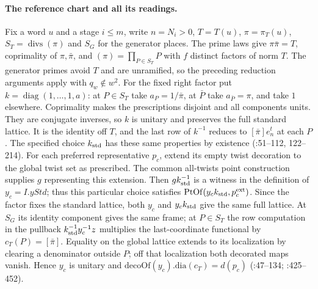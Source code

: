 \paragraph{The reference chart and all its readings.}
Fix a word $u$ and a stage $i\le m$, write $n=N_i>0$, $T=T(u)$, $\pi=\pi_T(u)$,
$S_T=\operatorname{divs}(\pi)$ and $S_G$ for the generator places.
The prime laws give
$\pi\bar\pi=T$, coprimality of $\pi,\bar\pi$, and
$(\pi)=\prod_{P\in S_T}P$ with $f$ distinct factors of norm $T$.
The generator primes avoid $T$ and are unramified, so the preceding
reduction arguments apply with $q_w\notin w^2$. For the fixed right
factor put $k=\operatorname{diag}(1,\ldots,1,a)$: at $P\in S_T$
take $a_P=1/\bar\pi$, at $\bar P$ take $a_{\bar P}=\pi$, and take
$1$ elsewhere. Coprimality makes the prescriptions disjoint and all
components units. They are conjugate inverses, so $k$ is unitary and
preserves the full standard lattice. It is the identity off $T$, and
the last row of $k^{-1}$ reduces to $[\bar\pi]e_n^t$ at each $P$.
The specified choice $k_{\rm std}$ has these same properties by
existence (:51--112,
122--214). For each preferred representative $p_c$, extend its empty
twist decoration to the global twist set as prescribed. The common
all-twists point construction supplies $g$ representing this extension.
Then $gk_{\rm std}^{-1}$ is a witness in the definition of $y_c=I.yStd$;
thus this particular choice satisfies $\mathrm{PtOf}(y_c k_{\rm std},p_c^{\rm ext})$.
Since the factor fixes the standard lattice, both $y_c$ and $y_c k_{\rm std}$
give the same full lattice. At $S_G$ its identity component gives the
same frame; at $P\in S_T$ the row computation in the pullback
$k_{\rm std}^{-1}y_c^{-1}z$ multiplies the last-coordinate functional
by $c_T(P)=[\bar\pi]$. Equality on the global lattice extends to its
localization by clearing a denominator outside $P$; off that localization
both decorated maps vanish. Hence $y_c$ is unitary and
$\mathrm{decoOf}(y_c).\mathrm{dia}(c_T)=d(p_c)$
(:47--134;
:425--452).

